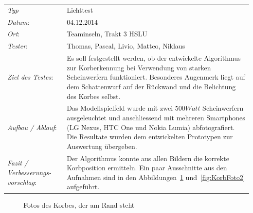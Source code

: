 \begin{tabular}{p{3.6cm}p{\textwidth-3.6cm-0.7cm}}
	\rule{0pt}{11pt}\textit{Typ}              & Lichttest  \\ 
	\rule{0pt}{11pt}\textit{Datum}:           & 04.12.2014   \\
	\rule{0pt}{11pt}\textit{Ort}:             & Teaminseln, Trakt 3 HSLU \\
	\rule{0pt}{11pt}\textit{Tester}:          & Thomas, Pascal, Livio, Matteo, Niklaus\\
	\rule{0pt}{11pt}\textit{Ziel des Testes}: & Es soll festgestellt werden, ob der entwickelte 
	Algorithmus zur Korberkennung bei Verwendung von starken Scheinwerfern funktioniert. Besonderes Augenmerk liegt auf dem Schattenwurf auf der Rückwand und die Belichtung des Korbes selbst. \\
	\rule{0pt}{11pt}\textit{Aufbau / Ablauf}: & Das Modellspielfeld wurde mit zwei $500 Watt$ 
	Scheinwerfern ausgeleuchtet und anschliessend mit mehreren Smartphones (LG Nexus, HTC One 
	und Nokia Lumia) abfotografiert. Die Resultate wurden dem entwickelten Prototypen zur Auswertung übergeben. 
	\\
	\rule{0pt}{11pt}\textit{Fazit / Verbesserungs-\newline vorschlag}: & Der Algorithmus konnte 
	aus allen Bildern die korrekte Korbposition ermitteln. Ein paar Ausschnitte aus den Aufnahmen 
	sind in den Abbildungen~\ref{fig:KorbFoto1} und~\ref{fig:KorbFoto2} aufgeführt. \\
\end{tabular}
%
\vspace{0.2cm}
%
\begin{figure}[h!]
\hfill
{}
\caption{Fotos des Korbes, der am Rand steht}
\label{fig:KorbFoto1}
\end{figure}

